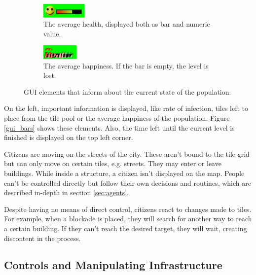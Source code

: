 \documentclass[table]{sig-alternate-05-2015}
\begin{document}
\begin{figure}[h]
\begin{center}
\begin{subfigure}{0.2\textwidth}
\begin{center}
\includegraphics[height = 20pt]{Pictures/gui_happy.png}
\caption{The average health, displayed both as bar and numeric value.}
\end{center}
\end{subfigure}
\begin{subfigure}{0.2\textwidth}
\begin{center}
\includegraphics[height = 20pt]{Pictures/gui_health.png}
\caption{The average happiness. If the bar is empty, the level is lost.}
\end{center}
\end{subfigure}
\caption{GUI elements that inform about the current state of the population.}
\label{fig:gui_bars}
\end{center}
\end{figure}

On the left, important information is displayed, like rate of infection, tiles left to place from the tile pool or the average happiness of the population. Figure \ref{gui_bars} shows these elements. Also, the time left until the current level is finished is displayed on the top left corner.

Citizens are moving on the streets of the city. These aren't bound to the tile grid but can only move on certain tiles, e.g. streets. They may enter or leave buildings. While inside a structure, a citizen isn't displayed on the map. People can't be controlled directly but follow their own decisions and routines, which are described in-depth in section \ref{sec:agents}. 

Despite having no means of direct control, citizens react to changes made to tiles. For example, when a blockade is placed, they will search for another way to reach a certain building. If they can't reach the desired target, they will wait, creating discontent in the process.

\subsection{Controls and Manipulating Infrastructure}
\label{sec:infra}
\end{document}
